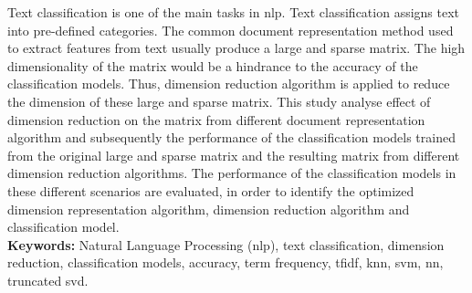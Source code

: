 Text classification is one of the main tasks in \ac{nlp}. Text classification assigns text into pre-defined categories. The common document representation method used to extract features from text usually produce a large and sparse matrix. The high dimensionality of the matrix would be a hindrance to the accuracy of the classification models. Thus, dimension reduction algorithm is applied to reduce the dimension of these large and sparse matrix. This study analyse effect of dimension reduction on the matrix from different document representation algorithm and subsequently the performance of the classification models trained from the original large and sparse matrix and the resulting matrix from different dimension reduction algorithms. The performance of the classification models in these different scenarios are evaluated, in order to identify the optimized dimension representation algorithm, dimension reduction algorithm and classification model.\\

\textbf{Keywords: } Natural Language Processing (\ac{nlp}), text classification, dimension reduction, classification models, accuracy, term frequency, \ac{tfidf}, \ac{knn}, \ac{svm}, \ac{nn}, truncated \ac{svd}.
